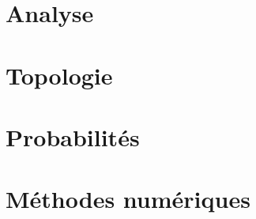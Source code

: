 \documentclass[a4paper, 11pt, twocolumn, oneside, openright]{report}
\theoremstyle{definition}
\begin{document}
\part{Analyse}








\part{Topologie}


\part{Probabilités}




\part{Méthodes numériques}






\restoregeometry
\end{document}
